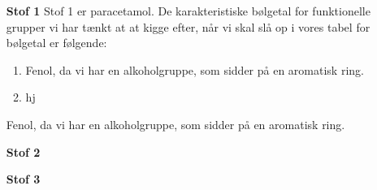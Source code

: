 \begin{enumerate}
\item[\textbf{Stof 1}] 
Stof 1 er paracetamol. De karakteristiske bølgetal for funktionelle grupper vi har tænkt at at kigge efter, når vi skal slå op i vores tabel for bølgetal er følgende: 
\begin{enumerate}
\item Fenol, da vi har en alkoholgruppe, som sidder på en aromatisk ring. 

\item hj
\end{enumerate}

Fenol, da vi har en alkoholgruppe, som sidder på en aromatisk ring. 
\item[\textbf{Stof 2}]

\item[\textbf{Stof 3}]

\end{enumerate}